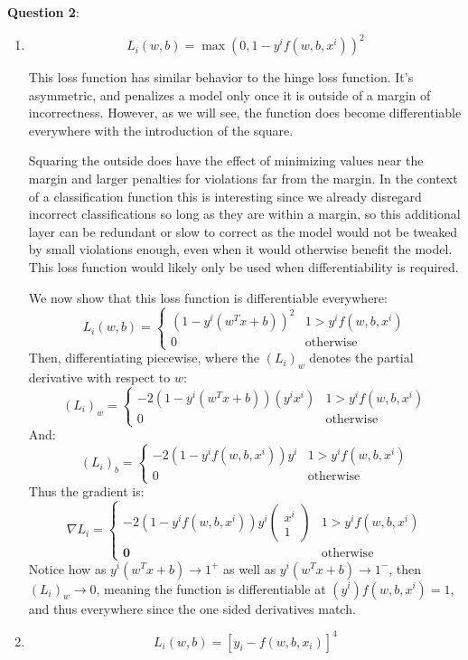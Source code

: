 \documentclass{article} %
\newcommand{\question}[2][]{
  \begin{flushleft}
    \textbf{Question #1}: \textit{#2}

\end{flushleft}}
\begin{document}
\question[2]{ }
\begin{enumerate}
  \item
    \[
      L_i(w, b) = \max(0, 1 - y^if(w,b,x^i))^2
    \]

    This loss function has similar behavior to the hinge loss
    function. It's asymmetric, and penalizes a model only once it is
    outside of a margin of incorrectness. However, as we will see,
    the function does become differentiable everywhere with the
    introduction of the square.

    Squaring the outside does have the effect of minimizing values
    near the margin and larger penalties for violations far from the
    margin. In the context of a classification function this
    is interesting since we already disregard incorrect
    classifications so long as they are within a margin, so this
    additional layer can be redundant or slow to correct as the
    model would not be tweaked by small violations enough, even when
    it would otherwise benefit the model. This loss function would
    likely only be used when differentiability is required.

    We now show that this loss function is differentiable everywhere:
    \[
      L_i(w,b) =
      \begin{cases}
        (1 - y^i(w^Tx +b))^2 &1 > y^if(w,b,x^i)\\
        0 &\text{otherwise}
      \end{cases}
    \]
    Then, differentiating piecewise, where the $(L_i)_w$ denotes the
    partial derivative with respect to $w$:
    \[
      (L_i)_w =
      \begin{cases}
        -2(1 - y^i(w^Tx +b))(y^ix^i) &1 > y^if(w,b,x^i)\\
        0 &\text{otherwise}
      \end{cases}
    \]
    And:
    \[
      (L_i)_b =
      \begin{cases}
        -2(1 - y^if(w,b,x^i))y^i &1 > y^if(w,b,x^i)\\
        0 &\text{otherwise}
      \end{cases}
    \]
    Thus the gradient is:
    \[
      \nabla L_i =
      \begin{cases}
        -2(1 - y^if(w,b,x^i))y^i
        \begin{pmatrix}
          x^i \\
          1
        \end{pmatrix}
        &1 > y^if(w,b,x^i)\\
        \mathbf{0} &\text{otherwise}
      \end{cases}
    \]
    Notice how as $y^i(w^Tx + b) \to 1^+$ as well as $y^i(w^Tx+b) \to
    1^-$, then $(L_i)_w \to 0$, meaning the function is
    differentiable at $(y^i)f(w,b,x^i) = 1$, and thus everywhere
    since the one sided derivatives match.
  \item
    \[
      L_i(w,b) = [y_i - f(w,b,x_i)]^4
    \]


\end{enumerate}
\end{document}
